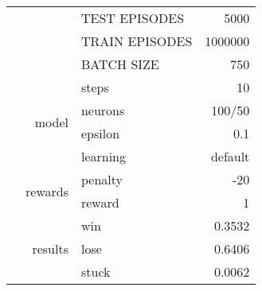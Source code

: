 \documentclass[9pt]{article}
\begin{document}
\begin{tabularx}{\textwidth}{l|r|X|r}
	& & TEST EPISODES & 5000 \\
	& & TRAIN EPISODES & 1000000 \\
	& & BATCH SIZE & 750 \\
	& & steps & 10\\\cline{2-4}
	& \multirow{2}{*}{model} & neurons & 100/50 \\ 
	& & epsilon & 0.1\\
	& & learning & default \\\cline{2-4}
	& \multirow{2}{*}{rewards} & penalty & -20\\
	& & reward& 1\\\cline{2-4}
	& \multirow{3}{*}{results} & win & 0.3532 \\
	& & lose & 0.6406 \\
	& & stuck & 0.0062 \\
	\hline
\end{tabularx}
\end{document}
